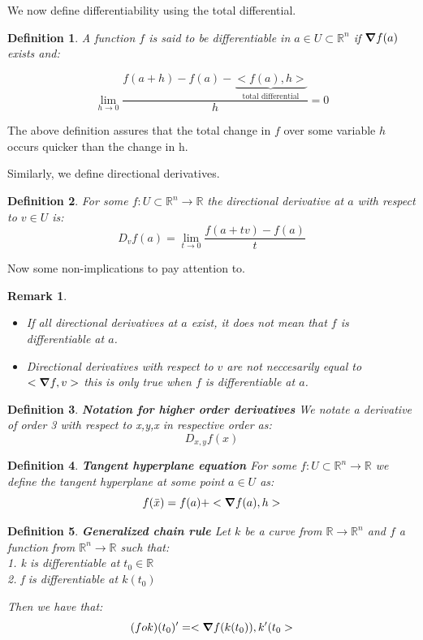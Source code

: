 \documentclass[titlepage]{article}
\newtheorem{remark}{Remark}[section]
\newtheorem{definition}{Definition}
\newcommand{\Rn}{\mathbb{R}^n}
\begin{document}
We now define differentiability using the total differential. 

\begin{definition}
A function $f$ is said to be differentiable in $a \in U \subset \Rn$ if $\grad f(a)$ exists and:

$$\lim_{h \to 0} \frac{f(a+h) - f(a) - \underbrace{<f(a),h>}_{\text{total differential}}}{h} = 0$$
\end{definition}

The above definition assures that the total change in $f$ over some variable $h$ occurs quicker than the change in h. 


Similarly, we define directional derivatives.

\begin{definition}
For some $f:U\subset \Rn \to \mathbb{R}$ the directional derivative at $a$ with respect to $v \in U$ is:
$$D_{v}f(a) = \lim_{t \to 0}\frac{f(a+tv)-f(a)}{t}$$
\end{definition}

Now some non-implications to pay attention to.

\begin{remark} 
\\
\begin{itemize}
    \item If all directional derivatives at $a$ exist, it does not mean that $f$ is differentiable at $a$.
    \item Directional derivatives with respect to $v$ are not neccesarily equal to $<\grad f,v>$ this is only true when $f$ is differentiable at $a$.  
\end{itemize}
\end{remark}

\begin{definition} \textbf{Notation for higher order derivatives}
We notate a derivative of order 3 with respect to x,y,x in respective order as:
$$D_{x,y}f(x)$$
\end{definition}

\begin{definition} \textbf{Tangent hyperplane equation}
For some $f:U\subset \Rn \to \mathbb{R}$ we define the tangent hyperplane at some point $a \in U$ as:
$$f(\bar{x}) = f(a) + <\grad f(a), h>$$
\end{definition}

\begin{definition}\textbf{Generalized chain rule}
Let $k$ be a curve from $\mathbb{R} \to \Rn$ and $f$ a function from $\Rn \to \mathbb{R}$ such that:
\\
1. k is differentiable at $t_{0} \in \mathbb{R}$
\\
2. f is differentiable at $k(t_{0})$

Then we have that:
$$(fok)(t_{0})^{\prime} = <\grad f(k(t_{0})), k^{\prime}(t_{0}>$$
\end{definition}
\end{document}
